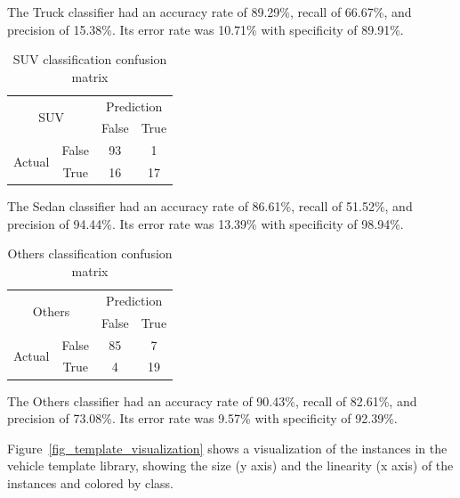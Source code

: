 \documentclass[conference]{IEEEtran}
\begin{document}
The Truck classifier had an accuracy rate of 89.29\%, recall of 66.67\%, and precision of 15.38\%. Its error rate was 10.71\% with specificity of 89.91\%. 

\begin{table}[]
\centering
\caption{SUV classification confusion matrix}
\label{cm:suv}
\begin{tabular}{|c|c|c|c|}
\hline
\multicolumn{2}{|c|}{\multirow{2}{*}{SUV}} & \multicolumn{2}{c|}{Prediction} \\ \cline{3-4} 
\multicolumn{2}{|c|}{}                       & False          & True           \\ \hline
\multirow{2}{*}{Actual}         & False      & 93             &  1              \\ \cline{2-4} 
                                & True       & 16             & 17             \\ \hline
\end{tabular}
\end{table}

The Sedan classifier had an accuracy rate of 86.61\%, recall of 51.52\%, and precision of 94.44\%. Its error rate was 13.39\% with specificity of 98.94\%. 

\begin{table}[]
\centering
\caption{Others classification confusion matrix}
\label{cm:others}
\begin{tabular}{|c|c|c|c|}
\hline
\multicolumn{2}{|c|}{\multirow{2}{*}{Others}} & \multicolumn{2}{c|}{Prediction} \\ \cline{3-4} 
\multicolumn{2}{|c|}{}                       & False          & True           \\ \hline
\multirow{2}{*}{Actual}         & False      & 85             &  7              \\ \cline{2-4} 
                                & True       &  4             & 19             \\ \hline
\end{tabular}
\end{table}

The Others classifier had an accuracy rate of 90.43\%, recall of 82.61\%, and precision of 73.08\%. Its error rate was 9.57\% with specificity of 92.39\%. 


Figure~\ref{fig_template_visualization} shows a visualization of the instances in the vehicle template library, showing the size (y axis) and the linearity (x axis) of the instances and colored by class. 
\end{document}

